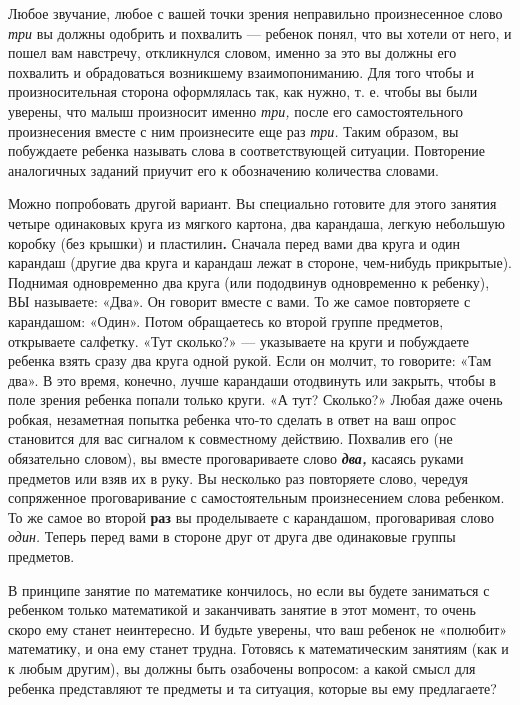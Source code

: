 \documentclass[a5paper]{book}
\renewcommand{\emph}[1]{\textit{#1}}
\begin{document}
Любое звучание, любое с вашей точки зрения неправильно произнесенное
слово \emph{три} вы должны одобрить и похвалить --- ребенок понял, что
вы хотели от него, и пошел вам навстречу, откликнулся словом, именно за
это вы должны его похвалить и обрадоваться возникшему взаимопониманию.
Для того чтобы и произносительная сторона оформлялась так, как нужно, т.
е. чтобы вы были уверены, что малыш произносит именно \emph{три,} после
его самостоятельного произнесения вместе с ним произнесите еще раз
\emph{три.} Таким образом, вы побуждаете ребенка называть слова в
соответствующей ситуации. Повторение аналогичных заданий приучит его к
обозначению количества словами.

Можно попробовать другой вариант. Вы специально готовите для этого
занятия четыре одинаковых круга из мягкого картона, два карандаша,
легкую небольшую коробку (без крышки) и пластилин\textbf{.} Сначала
перед вами два круга и один карандаш (другие два круга и карандаш лежат
в стороне, чем-нибудь прикрытые). Поднимая одновременно два круга (или
пододвинув одновременно к ребенку), ВЫ называете: «Два». Он говорит
вместе с вами. То же самое повторяете с карандашом: «Один». Потом
обращаетесь ко второй группе предметов, открываете салфетку. «Тут
сколько?» --- указываете на круги и побуждаете ребенка взять сразу два
круга одной рукой. Если он молчит, то говорите: «Там два». В это время,
конечно, лучше карандаши отодвинуть или закрыть, чтобы в поле зрения
ребенка попали только круги. «А тут? Сколько?» Любая даже очень робкая,
незаметная попытка ребенка что-то сделать в ответ на ваш опрос
становится для вас сигналом к совместному действию. Похвалив его (не
обязательно словом), вы вместе проговариваете слово \emph{\textbf{два,}}
касаясь руками предметов или взяв их в руку. Вы несколько раз повторяете
слово, чередуя сопряженное проговаривание с самостоятельным
произнесением слова ребенком. То же самое во второй \textbf{раз} вы
проделываете с карандашом, проговаривая слово \emph{один.} Теперь перед
вами в стороне друг от друга две одинаковые группы предметов.

В принципе занятие по математике кончилось, но если вы будете заниматься
с ребенком только математикой и заканчивать занятие в этот момент, то
очень скоро ему станет неинтересно. И будьте уверены, что ваш ребенок не
«полюбит» математику, и она ему станет трудна. Готовясь к математическим
занятиям (как и к любым другим), вы должны быть озабочены вопросом: а
какой смысл для ребенка представляют те предметы и та ситуация, которые
вы ему предлагаете?
\end{document}
